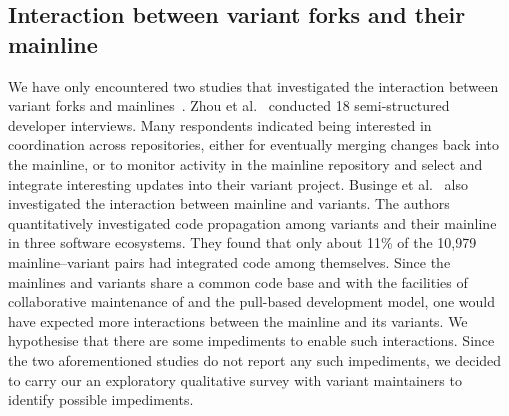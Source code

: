 \subsection{Interaction between variant forks and their mainline}
We have only encountered two studies that investigated the interaction between variant forks and mainlines~\cite{Zhou:2020,businge:emse:2021}.
Zhou et al.~\cite{Zhou:2020} conducted 18 semi-structured developer interviews. Many respondents indicated being interested in coordination across repositories, either for eventually merging changes back into the mainline, or to monitor activity in the mainline repository and select and integrate interesting updates into their variant project.
Businge et al.~\cite{businge:emse:2021} also  investigated the interaction between mainline and variants. The authors quantitatively investigated code propagation among variants and their mainline in three software ecosystems. They found that only about 11\% of the 10,979 mainline--variant pairs had integrated code among themselves.
Since the mainlines and variants share a common code base and with the facilities of collaborative maintenance of \git and the pull-based development model,
one would have expected more interactions between the mainline and its variants. We hypothesise that there are some impediments to enable such interactions.
Since the two aforementioned studies do not report any such impediments,
we decided to carry our an exploratory qualitative survey with variant maintainers to identify possible impediments.


